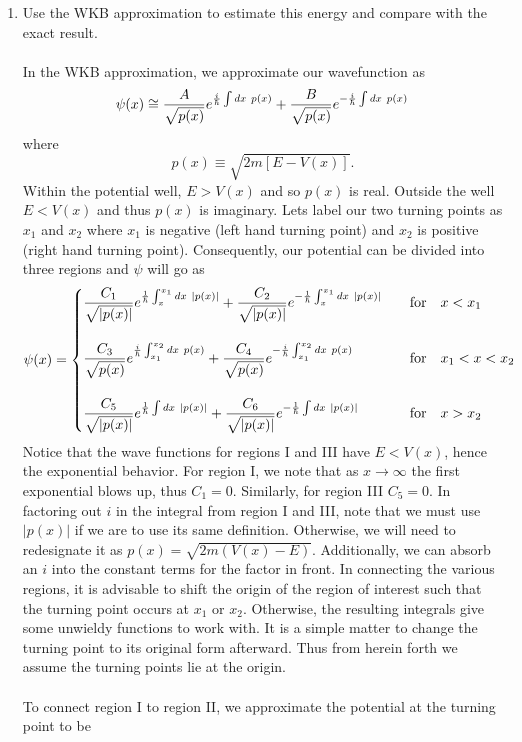 \documentclass[11pt,letterpaper]{article}
\begin{document}
\begin{enumerate}
\begin{enumerate}
\item
Use the WKB approximation to estimate this energy and compare with the exact result. 
\\ \\In the WKB approximation, we approximate our wavefunction as
$$\psi(x) \cong \frac{A}{\sqrt{p(x)}}e^{\frac{i}{\hbar}\int{dx\  p(x)}}+\frac{B}{\sqrt{p(x)}}e^{-\frac{i}{\hbar}\int{dx\  p(x)}}$$
where $$p(x) \equiv \sqrt{2m[E-V(x)]}.$$
Within the potential well, $E>V(x)$ and so $p(x)$ is real. Outside the well $E<V(x)$ and thus $p(x)$ is imaginary. Lets label our two turning points as $x_1$ and $x_2$ where $x_1$ is negative (left hand turning point) and $x_2$ is positive (right hand turning point). Consequently, our potential can be divided into three regions and $\psi$ will go as
$$\psi(x) = \begin{cases} \displaystyle\frac{C_1}{\sqrt{|p(x)|}}e^{\frac{1}{\hbar}\int_x^{x_1}{dx\  |p(x)|}}+\frac{C_2}{\sqrt{|p(x)|}}e^{-\frac{1}{\hbar}\int_x^{x_1}{dx\  |p(x)|}}&\quad\text{for}\quad x<x_1\\ \\
 \displaystyle\frac{C_3}{\sqrt{p(x)}}e^{\frac{i}{\hbar}\int_{x_1}^{x_2}{dx\  p(x)}}+\frac{C_4}{\sqrt{p(x)}}e^{-\frac{i}{\hbar}\int_{x_1}^{x_2}{dx\  p(x)}}&\quad\text{for}\quad x_1<x<x_2\\ \\
  \displaystyle\frac{C_5}{\sqrt{|p(x)|}}e^{\frac{1}{\hbar}\int{dx\  |p(x)|}}+\frac{C_6}{\sqrt{|p(x)|}}e^{-\frac{1}{\hbar}\int{dx\  |p(x)|}}&\quad\text{for}\quad x>x_2
\end{cases}
$$
Notice that the wave functions for regions I and III have $E<V(x)$, hence the exponential behavior. For region I, we note that as $x\to\infty$ the first exponential blows up, thus $C_1 = 0$. Similarly, for region III $C_5 = 0$. In factoring out $i$ in the integral from region I and III, note that we must use $|p(x)|$ if we are to use its same definition. Otherwise, we will need to redesignate it as $p(x) = \sqrt{2m(V(x)-E)}$. Additionally, we can absorb an $i$ into the constant terms for the factor in front. In connecting the various regions, it is advisable to shift the origin of the region of interest such that the turning point occurs at $x_1$ or $x_2$. Otherwise, the resulting integrals give some unwieldy functions to work with. It is a simple matter to change the turning point to its original form afterward. Thus from herein forth we assume the turning points lie at the origin. 
\\ \\To connect region I to region II, we approximate the potential at the turning point to be

\end{enumerate}
\end{enumerate}
\end{document}
